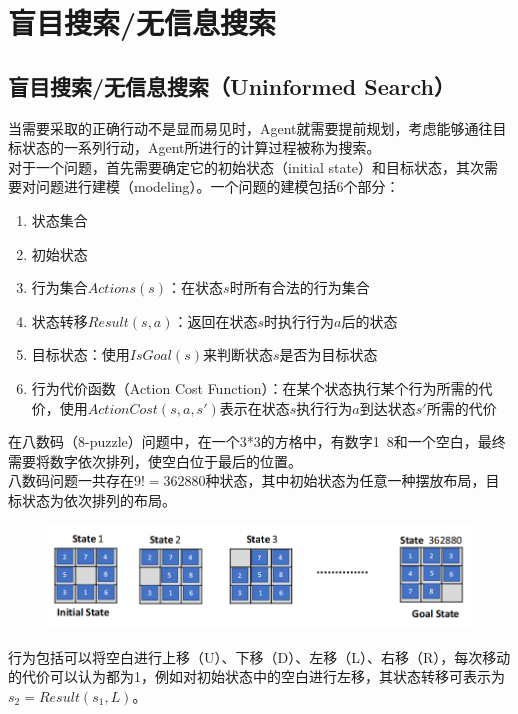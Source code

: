 \section{盲目搜索/无信息搜索}

\subsection{盲目搜索/无信息搜索（Uninformed Search）}

当需要采取的正确行动不是显而易见时，Agent就需要提前规划，考虑能够通往目标状态的一系列行动，Agent所进行的计算过程被称为搜索。\\

对于一个问题，首先需要确定它的初始状态（initial state）和目标状态，其次需要对问题进行建模（modeling）。一个问题的建模包括6个部分：

\begin{enumerate}
    \item 状态集合
    \item 初始状态
    \item 行为集合$ Actions(s) $：在状态$ s $时所有合法的行为集合
    \item 状态转移$ Result(s, a) $：返回在状态$ s $时执行行为$ a $后的状态
    \item 目标状态：使用$ IsGoal(s) $来判断状态$ s $是否为目标状态
    \item 行为代价函数（Action Cost Function）：在某个状态执行某个行为所需的代价，使用$ ActionCost(s, a, s') $表示在状态$ s $执行行为$ a $到达状态$ s' $所需的代价
\end{enumerate}

在八数码（8-puzzle）问题中，在一个3*3的方格中，有数字1~8和一个空白，最终需要将数字依次排列，使空白位于最后的位置。\\

八数码问题一共存在$ 9! = 362880 $种状态，其中初始状态为任意一种摆放布局，目标状态为依次排列的布局。

\begin{figure}[H]
    \centering
    \includegraphics[scale=0.8]{img/C1/1-3/1.png}
\end{figure}

行为包括可以将空白进行上移（U）、下移（D）、左移（L）、右移（R），每次移动的代价可以认为都为1，例如对初始状态中的空白进行左移，其状态转移可表示为$ s_2 = Result(s_1, L) $。\\

